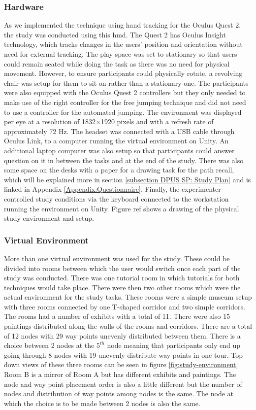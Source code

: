 \subsubsection{Hardware}
\label{subsubsection DPUS SP SS: Hardware}
As we implemented the technique using hand tracking for the Oculus Quest 2, the study was conducted using this \acrshort{hmd}. The Quest 2 has Oculus Insight technology, which tracks changes in the users' position and orientation without need for external tracking. The play space was set to stationary so that users could remain seated while doing the task as there was no need for physical movement. However, to ensure participants could physically rotate, a revolving chair was setup for them to sit on rather than a stationary one. The participants were also equipped with the Oculus Quest 2 controllers but they only needed to make use of the right controller for the free jumping technique and did not need to use a controller for the automated jumping. The environment was displayed per eye at a resolution of 1832×1920 pixels and with a refresh rate of approximately 72 Hz. The headset was connected with a USB cable through Oculus Link, to a computer running the virtual environment on Unity. An additional laptop computer was also setup so that participants could answer question on it in between the tasks and at the end of the study. There was also some space on the desks with a paper for a drawing task for the path recall, which will be explained more in section \ref{subsection DPUS SP: Study Plan} and is linked in Appendix \ref*{Appendix:Questionnaire}. Finally, the experimenter controlled study conditions via the keyboard connected to the workstation running the environment on Unity. Figure ref shows a drawing of the physical study environment and setup.
 
\subsubsection{Virtual Environment}
\label{subsubsection DPUS SP SS: Virtual Environment} 
More than one virtual environment was used for the study. These could be divided into rooms between which the user would switch once each part of the study was conducted. There was one tutorial room in which tutorials for both techniques would take place. There were then two other rooms which were the actual environment for the study tasks. These rooms were a simple museum setup with three rooms connected by one T-shaped corridor and two simple corridors. The rooms had a number of exhibits with a total of 11. There were also 15 paintings distributed along the walls of the rooms and corridors. There are a total of 12 nodes with 29 way points unevenly distributed between them. There is a choice between 2 nodes at the $5^{th}$ node meaning that participants only end up going through 8 nodes with 19 unevenly distribute way points in one tour. Top down views of these three rooms can be seen in figure \ref{fig:study-environment}. Room B is a mirror of Room A but has different exhibits and paintings. The node and way point placement order is also a little different but the number of nodes and distribution of way points among nodes is the same. The node at which the choice is to be made between 2 nodes is also the same. 

